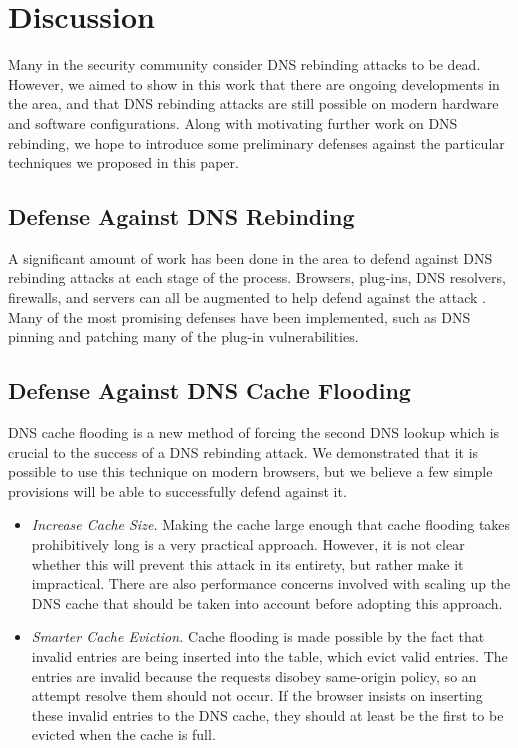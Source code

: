 \section{Discussion}
\label{sec:disc}

Many in the security community consider DNS rebinding attacks to be dead. However, we aimed to show in this work that there are ongoing developments in the area, and that DNS rebinding attacks are still possible on modern hardware and software configurations. Along with motivating further work on DNS rebinding, we hope to introduce some preliminary defenses against the particular techniques we proposed in this paper.

\subsection{Defense Against DNS Rebinding}

A significant amount of work has been done in the area to defend against DNS rebinding attacks at each stage of the process. Browsers, plug-ins, DNS resolvers, firewalls, and servers can all be augmented to help defend against the attack \cite{protectFromDNS}. Many of the most promising defenses have been implemented, such as DNS pinning and patching many of the plug-in vulnerabilities.

\subsection{Defense Against DNS Cache Flooding}

DNS cache flooding is a new method of forcing the second DNS lookup which is crucial to the success of a DNS rebinding attack. We demonstrated that it is possible to use this technique on modern browsers, but we believe a few simple provisions will be able to successfully defend against it. 

\begin{itemize}
\item \emph{Increase Cache Size.} Making the cache large enough that cache flooding takes prohibitively long is a very practical approach. However, it is not clear whether this will prevent this attack in its entirety, but rather make it impractical. There are also performance concerns involved with scaling up the DNS cache that should be taken into account before adopting this approach. 
\item \emph{Smarter Cache Eviction.} Cache flooding is made possible by the fact that invalid entries are being inserted into the table, which evict valid entries. The entries are invalid because the requests disobey same-origin policy, so an attempt resolve them should not occur. If the browser insists on inserting these invalid entries to the DNS cache, they should at least be the first to be evicted when the cache is full.
\end{itemize}


